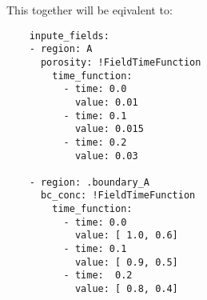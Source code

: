 This together will be eqivalent to:
\begin{verbatim}
    inpute_fields:
    - region: A
      porosity: !FieldTimeFunction
        time_function: 
          - time: 0.0
            value: 0.01
          - time: 0.1
            value: 0.015
          - time: 0.2
            value: 0.03
           
    - region: .boundary_A        
      bc_conc: !FieldTimeFunction
        time_function: 
          - time: 0.0
            value: [ 1.0, 0.6]
          - time: 0.1
            value: [ 0.9, 0.5]
          - time:  0.2
            value: [ 0.8, 0.4]
\end{verbatim}




%








